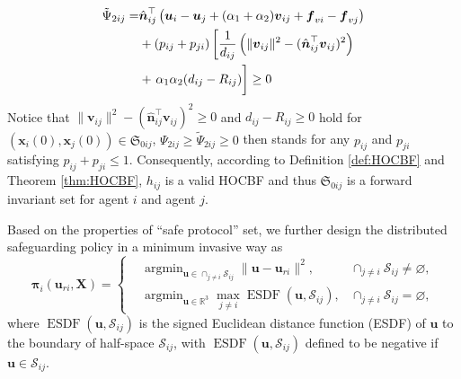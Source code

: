 \documentclass{ifacconf}
\begin{document}
\begin{pf}
\begin{equation}
   \begin{aligned}
      \tilde{\Psi}_{2ij} =& \hat{\boldsymbol{n}}_{ij}^\top \left(\boldsymbol{u}_i - \boldsymbol{u}_j + (\alpha_1 + \alpha_2)\boldsymbol{v}_{ij} + \boldsymbol{f}_{vi} - \boldsymbol{f}_{vj} \right) \\
      &+ (p_{ij} + p_{ji})\left[ \frac{1}{d_{ij}} \left( \|\boldsymbol{v}_{ij}\|^2 -  (\hat{\boldsymbol{n}}_{ij}^{\top}\boldsymbol{v}_{ij} )^2 \right) \right. \\
      &+ \left. \alpha_1 \alpha_2 (d_{ij} - R_{ij}) 
            \vphantom{ \frac{1}{d_{ij}} \left( \|\boldsymbol{v}_{ij}\|^2 -  (\hat{\boldsymbol{n}}_{ij}^{\top}\boldsymbol{v}_{ij} )^2 \right) } 
         \right] \ge 0
   \end{aligned}
\end{equation}
Notice that $\|\boldsymbol{v}_{ij}\|^2 -  (\hat{\boldsymbol{n}}_{ij}^{\top}\boldsymbol{v}_{ij} )^2  \ge 0$ and $d_{ij} - R_{ij} \ge 0$ hold for $(\boldsymbol{x}_i(0), \boldsymbol{x}_j(0)) \in \mathfrak{S}_{0ij}$, $\Psi_{2ij} \ge \tilde{\Psi}_{2ij} \ge 0$ then stands for any $p_{ij}$ and $p_{ji}$ satisfying $p_{ij} + p_{ji} \le 1$.
Consequently, according to Definition \ref{def:HOCBF} and Theorem \ref{thm:HOCBF}, $h_{ij}$ is a valid HOCBF and thus $\mathfrak{S}_{0ij}$ is a forward invariant set for agent $i$ and agent $j$.
\end{pf}

Based on the properties of ``safe protocol'' set, we further design the distributed safeguarding policy in a minimum invasive way as
\begin{equation}\label{eqn:strategy}
   \boldsymbol{\pi}_i(\boldsymbol{u}_{ri}, \boldsymbol{X}) = 
   \left\{
   \begin{aligned}
      &\mathop{\arg \min}_{\boldsymbol{u} \in \cap_{j \neq i} \mathcal{S}_{ij}} \| \boldsymbol{u} - \boldsymbol{u}_{ri} \|^2,    &\cap_{j \neq i} \mathcal{S}_{ij} \neq \varnothing, \\
      &\mathop{\arg \min}_{\boldsymbol{u} \in \mathbb{R}^3 }\mathop{\max}_{j \neq i} \mathop{\mathrm{ESDF}}(\boldsymbol{u}, \mathcal{S}_{ij}),     &\cap_{j \neq i} \mathcal{S}_{ij} = \varnothing,
   \end{aligned}
   \right.
\end{equation}
where $\mathop{\mathrm{ESDF}}(\boldsymbol{u}, \mathcal{S}_{ij})$ is the signed Euclidean distance function (ESDF) of $\boldsymbol{u}$ to the boundary of half-space $\mathcal{S}_{ij}$, with $\mathop{\mathrm{ESDF}}(\boldsymbol{u}, \mathcal{S}_{ij})$ defined to be negative if $\boldsymbol{u} \in \mathcal{S}_{ij}$.
\end{document}
